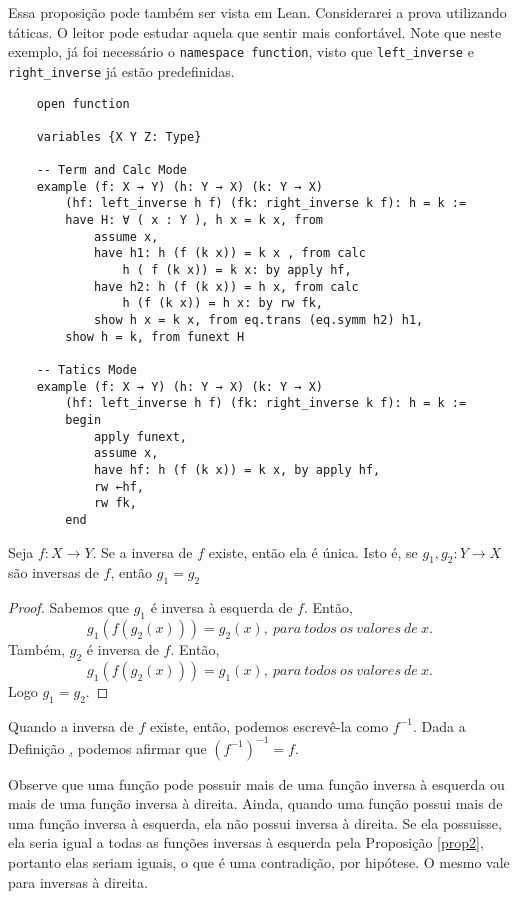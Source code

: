 Essa proposição pode também ser vista em Lean. Considerarei a prova utilizando táticas. O leitor pode estudar
aquela que sentir mais confortável. Note que neste exemplo, já foi necessário o \lstinline{namespace function},
visto que \lstinline{left_inverse} e \lstinline{right_inverse} já estão predefinidas.

\begin{lstlisting}
    open function

    variables {X Y Z: Type}

    -- Term and Calc Mode
    example (f: X → Y) (h: Y → X) (k: Y → X)
        (hf: left_inverse h f) (fk: right_inverse k f): h = k :=
        have H: ∀ ( x : Y ), h x = k x, from
            assume x,
            have h1: h (f (k x)) = k x , from calc
                h ( f (k x)) = k x: by apply hf,
            have h2: h (f (k x)) = h x, from calc
                h (f (k x)) = h x: by rw fk,
            show h x = k x, from eq.trans (eq.symm h2) h1,
        show h = k, from funext H

    -- Tatics Mode
    example (f: X → Y) (h: Y → X) (k: Y → X)
        (hf: left_inverse h f) (fk: right_inverse k f): h = k :=
        begin
            apply funext,
            assume x,
            have hf: h (f (k x)) = k x, by apply hf,
            rw ←hf,
            rw fk,
        end
\end{lstlisting}

\begin{theorem}
    \label{prop3}
    Seja $f: X \to Y$. Se a inversa de $f$ existe, então ela é única. Isto é, se $g_1, g_2: Y \to X$ são inversas
    de $f$, então $g_1 = g_2$
\end{theorem}
\begin{proof}
    Sabemos que $g_1$ é inversa à esquerda de $f$. Então,
    $$g_1(f(g_2(x))) = g_2(x), ~para~todos~os~valores~de~x.$$
    Também, $g_2$ é inversa de $f$. Então,
    $$g_1(f(g_2(x))) = g_1(x), ~para~todos~os~valores~de~x.$$ Logo $g_1 = g_2$.
\end{proof}

Quando a inversa de $f$ existe, então, podemos escrevê-la como $f^{-1}$. Dada a Definição \hyperlink{def4},
podemos afirmar que $(f^{-1})^{-1} = f$.

Observe que uma função pode possuir mais de uma função inversa à esquerda ou mais de uma função inversa
à direita. Ainda, quando uma função possui mais de uma função inversa à esquerda, ela não possui inversa
à direita. Se ela possuisse, ela seria igual a todas as funções inversas à esquerda pela Proposição \ref{prop2},
portanto elas seriam iguais, o que é uma contradição, por hipótese. O mesmo vale para inversas à direita.

